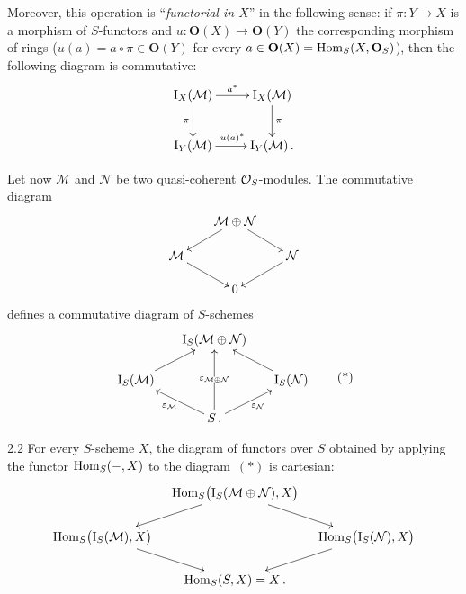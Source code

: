 Moreover, this operation is ``\emph{functorial in \(X\)}'' in the following
sense: if \(\pi\colon Y\to X\) is a morphism of \(S\)-functors and
\(u\colon\mathbf{O}(X)\to\mathbf{O}(Y)\) the corresponding morphism of rings
(\ie \(u(a)=a\circ\pi\in\mathbf{O}(Y)\) for every
\(a\in\mathbf{O}(X)=\operatorname{Hom}_S(X,\mathbf{O}_S)\)), then the following diagram is
commutative:
\[
\xymatrix{
\mathrm{I}_X(\mathcal{M}) \ar[r]^{a^*} \ar[d]_{\pi}
  & \mathrm{I}_X(\mathcal{M}) \ar[d]^{\pi} \\
\mathrm{I}_Y(\mathcal{M}) \ar[r]^{u(a)^*}
  & \mathrm{I}_Y(\mathcal{M})\,.
}
\]

Let now \(\mathcal{M}\) and \(\mathcal{N}\) be two quasi-coherent
\(\mathcal{O}_S\)-modules. The commutative diagram
\[
\xymatrix@C=1.8em@R=1.4em{
& \mathcal{M}\oplus\mathcal{N} \ar[dl] \ar[dr] & \\
\mathcal{M} \ar[dr] & & \mathcal{N} \ar[dl] \\
& 0 &
}
\]
defines a commutative diagram of \(S\)-schemes
\begin{equation}
\vcenter{\xymatrix@C=1.6em@R=1.6em{
& \mathrm{I}_S(\mathcal{M}\oplus\mathcal{N}) & \\
\mathrm{I}_S(\mathcal{M}) \ar[ur]
  & &
\mathrm{I}_S(\mathcal{N}) \ar[ul] \\
& S
  \ar[ul]^{\varepsilon_{\mathcal{M}}}
  \ar[uu]|{\varepsilon_{\mathcal{M}\oplus\mathcal{N}}}
  \ar[ur]_{\varepsilon_{\mathcal{N}}}\,. &
}}
\tag{*}
\end{equation}

\begin{proposition}{2.2}
\label{II.2.2}
For every \(S\)-scheme \(X\), the diagram of functors over \(S\) obtained by
applying the functor \(\operatorname{Hom}_S(-,X)\) to the diagram~\((*)\) is cartesian:
\[
\xymatrix@C=1em@R=1.7em{
& \Hom_S\bigl(\mathrm{I}_S(\mathcal{M}\oplus\mathcal{N}),X\bigr)
  \ar[dl] \ar[dr] & \\
\Hom_S\bigl(\mathrm{I}_S(\mathcal{M}),X\bigr) \ar[dr]
  & &
\Hom_S\bigl(\mathrm{I}_S(\mathcal{N}),X\bigr) \ar[dl] \\
& \Hom_S(S,X)=X\,. &
}
\]
\end{proposition}

